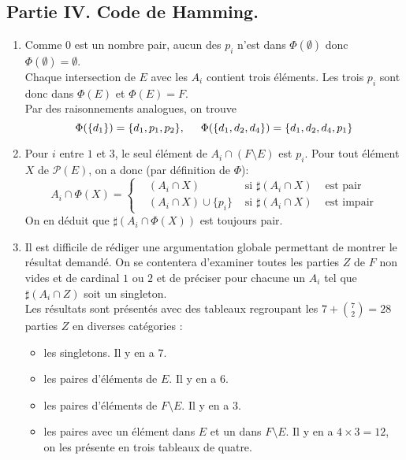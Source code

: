 \subsection*{Partie IV. Code de Hamming.}
\begin{enumerate}
 \item Comme $0$ est un nombre pair, aucun des $p_i$ n'est dans $\Phi(\emptyset)$ donc $\Phi(\emptyset)=\emptyset$.\\
Chaque intersection de $E$ avec les $A_i$ contient trois éléments. Les trois $p_i$ sont donc dans $\Phi(E)$ et $\Phi(E)=F$.\\
Par des raisonnements analogues, on trouve 
\begin{displaymath}
 \Phi(\{d_1\}) = \{d_1,p_1,p_2\},\hspace{0.5cm} \Phi(\{d_1,d_2,d_4\}) = \{d_1,d_2,d_4,p_1\}
\end{displaymath}
\item Pour $i$ entre $1$ et $3$, le seul élément de $A_i\cap (F\setminus E)$ est $p_i$. Pour tout élément $X$ de $\mathcal P(E)$, on a donc (par définition de $\Phi$):
\begin{displaymath}
 A_i\cap \Phi(X)=
\left\lbrace
\begin{aligned}
 &\left( A_i \cap X\right)  &\text{ si } \sharp\left( A_i \cap X \right)& \text{ est pair}\\ 
 &\left( A_i \cap X\right) \cup\{p_i\} &\text{ si } \sharp\left( A_i \cap X \right)& \text{ est impair}
\end{aligned}
 \right. 
\end{displaymath}
On en déduit que $\sharp\left( A_i\cap \Phi(X)\right) $ est toujours pair.
\item Il est difficile de rédiger une argumentation globale permettant de montrer le résultat demandé. On se contentera d'examiner toutes les parties $Z$ de $F$ non vides et de cardinal $1$ ou $2$ et de préciser pour chacune un $A_i$ tel que $\sharp(A_i\cap Z)$ soit un singleton.\\
Les résultats sont présentés avec des tableaux regroupant les $7+\binom{7}{2}=28$ parties $Z$ en diverses catégories :
\begin{itemize}
 \item les singletons. Il y en a $7$.
\item les paires d'éléments de $E$. Il y en a $6$.
\item les paires d'éléments de $F\setminus E$. Il y en a $3$.
\item les paires avec un élément dans $E$ et un dans $F\setminus E$. Il y en a $4\times 3=12$, on les présente en trois tableaux de quatre.  

\end{itemize}
\end{enumerate}
